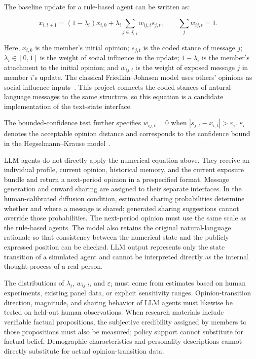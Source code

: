 \documentclass[11pt,a4paper]{article}
\begin{document}
The baseline update for a rule-based agent can be written as:

\begin{equation*}
x_{i,t+1}
=
(1-\lambda_i)x_{i,0}
+
\lambda_i
\sum_{j\in J_{i,t}}
w_{ij,t}s_{j,t},
\qquad
\sum_jw_{ij,t}=1.
\end{equation*}

Here, $x_{i,0}$ is the member's initial opinion; $s_{j,t}$ is the coded stance of message $j$; $\lambda_i\in[0,1]$ is the weight of social influence in the update; $1-\lambda_i$ is the member's attachment to the initial opinion; and $w_{ij,t}$ is the weight of exposed message $j$ in member $i$'s update. The classical Friedkin--Johnsen model uses others' opinions as social-influence inputs~\citep{friedkin1990}. This project connects the coded stances of natural-language messages to the same structure, so this equation is a candidate implementation of the text-state interface.

The bounded-confidence test further specifies $w_{ij,t}=0$ when $|s_{j,t}-x_{i,t}|>\varepsilon_i$. $\varepsilon_i$ denotes the acceptable opinion distance and corresponds to the confidence bound in the Hegselmann--Krause model~\citep{hegselmann2002}.

LLM agents do not directly apply the numerical equation above. They receive an individual profile, current opinion, historical memory, and the current exposure bundle and return a next-period opinion in a prespecified format. Message generation and onward sharing are assigned to their separate interfaces. In the human-calibrated diffusion condition, estimated sharing probabilities determine whether and where a message is shared; generated sharing suggestions cannot override those probabilities. The next-period opinion must use the same scale as the rule-based agents. The model also retains the original natural-language rationale so that consistency between the numerical state and the publicly expressed position can be checked. LLM output represents only the state transition of a simulated agent and cannot be interpreted directly as the internal thought process of a real person.

The distributions of $\lambda_i$, $w_{ij,t}$, and $\varepsilon_i$ must come from estimates based on human experiments, existing panel data, or explicit sensitivity ranges. Opinion-transition direction, magnitude, and sharing behavior of LLM agents must likewise be tested on held-out human observations. When research materials include verifiable factual propositions, the subjective credibility assigned by members to those propositions must also be measured; policy support cannot substitute for factual belief. Demographic characteristics and personality descriptions cannot directly substitute for actual opinion-transition data.
\end{document}
